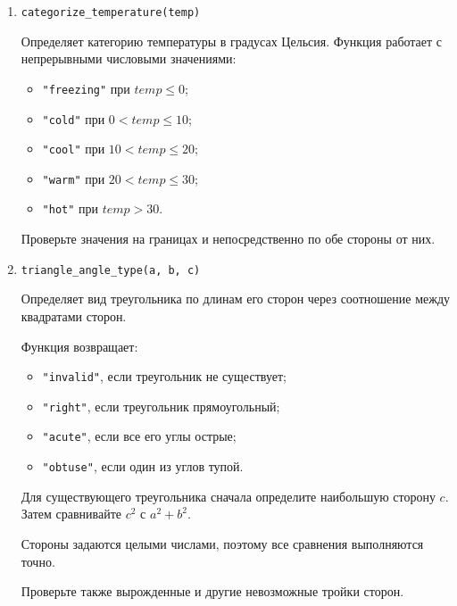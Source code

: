 \begin{enumerate}
Предполагается, что \texttt{weight} и \texttt{height} положительны.
Поведение при \texttt{height} $\leq 0$ или \texttt{weight} $\leq 0$
не определено и в тестах не проверяется.

Так как $BMI$ --- величина с плавающей точкой, при проверке границ
допускается сравнение с точностью до $10^{-9}$.

Проверьте значения непосредственно на каждой границе категорий и по обе
стороны от каждой границы.

\item \texttt{categorize\_temperature(temp)}

Определяет категорию температуры в градусах Цельсия. Функция работает
с непрерывными числовыми значениями:
\begin{itemize}
    \item \texttt{"freezing"} при $temp \leq 0$;
    \item \texttt{"cold"} при $0 < temp \leq 10$;
    \item \texttt{"cool"} при $10 < temp \leq 20$;
    \item \texttt{"warm"} при $20 < temp \leq 30$;
    \item \texttt{"hot"} при $temp > 30$.
\end{itemize}

Проверьте значения на границах и непосредственно по обе стороны от них.

\item \texttt{triangle\_angle\_type(a, b, c)}

Определяет вид треугольника по длинам его сторон через соотношение
между квадратами сторон.

Функция возвращает:
\begin{itemize}
    \item \texttt{"invalid"}, если треугольник не существует;
    \item \texttt{"right"}, если треугольник прямоугольный;
    \item \texttt{"acute"}, если все его углы острые;
    \item \texttt{"obtuse"}, если один из углов тупой.
\end{itemize}

Для существующего треугольника сначала определите наибольшую сторону
$c$. Затем сравнивайте $c^2$ с $a^2+b^2$.

Стороны задаются целыми числами, поэтому все сравнения выполняются точно.

Проверьте также вырожденные и другие невозможные тройки сторон.


\end{enumerate}
